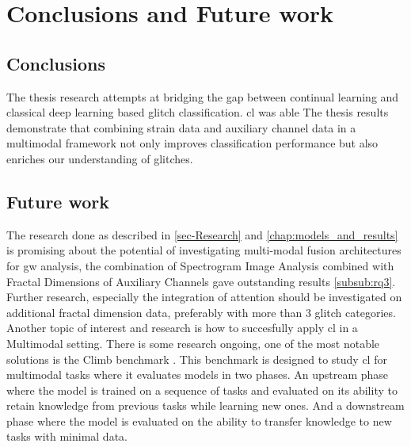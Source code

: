\chapter{Conclusions and Future work}
\label{ch:6}
\section{Conclusions}
The thesis research attempts at bridging the gap between continual learning and classical deep learning based glitch classification. \acrshort{cl} was able 
The thesis results demonstrate that combining strain data and auxiliary channel data in a multimodal framework not only improves classification performance but also enriches our understanding of glitches. 

\section{Future work}
The research done as described in \ref{sec-Research} and \ref{chap:models_and_results} is promising about the potential of investigating multi-modal fusion architectures for \acrshort{gw} analysis, the combination of Spectrogram Image Analysis combined with Fractal Dimensions of Auxiliary Channels gave outstanding results \ref{subsub:rq3}. \\
Further research, especially the integration of attention \citep{vaswani2017attention, niu2021review} should be investigated on additional fractal dimension data, preferably with more than 3 glitch categories. \\
Another topic of interest and research is how to succesfully apply \acrshort{cl} in a Multimodal setting. There is some research ongoing, one of the most notable solutions is the Climb benchmark \citep{srinivasan2022climb}. This benchmark is designed to study \acrshort{cl} for multimodal tasks where it evaluates models in two phases. An upstream phase where the model is trained on a sequence of tasks and evaluated on its ability to retain knowledge from previous tasks while learning new ones. And a downstream phase where the model is evaluated on the ability to transfer knowledge to new tasks with minimal data. 